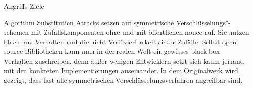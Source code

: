\begin{section}{Angriffs Ziele}
\label{sec:angriffs_ziele}

Algorithm Substitution Attacks setzen auf symmetrische Verschlüsselungs"-schemen mit Zufallskomponenten ohne und mit öffentlichen nonce auf. Sie nutzen black-box Verhalten und die nicht Verifizierbarkeit dieser Zufälle. Selbst open source Bibliotheken kann man in der realen Welt ein gewisses black-box Verhalten zuschreiben, denn außer wenigen Entwicklern setzt sich kaum jemand mit den konkreten Implementierungen auseinander. In dem Originalwerk wird gezeigt, dass fast alle symmetrischen Verschlüsselungsverfahren angreifbar sind.

\end{section}
